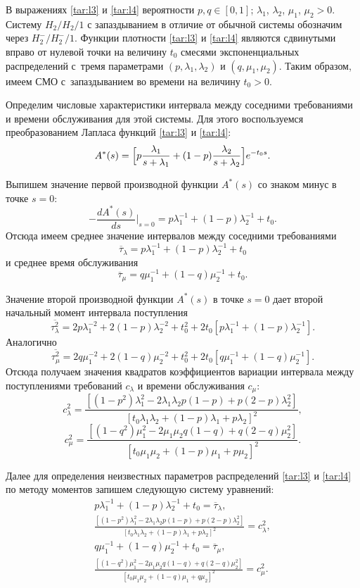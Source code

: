 В выражениях \eqref{tar:l3} и \eqref{tar:l4} вероятности $p,q\in[0,1]$; 
$\lambda_1$, $\lambda_2$, $\mu_1$, $\mu_2>0$. 
Систему $H_2/H_2/1$ с запаздыванием в отличие от обычной системы обозначим через $H_2^-/H_2^-/1$. 
Функции плотности \eqref{tar:l3} и \eqref{tar:l4} являются сдвинутыми вправо от нулевой точки на величину $t_0$ смесями экспоненциальных распределений с~тремя параметрами $(p,\lambda_1,\lambda_2)$ и $(q,\mu_1,\mu_2)$. 
Таким образом, имеем СМО с~запаздыванием во времени на величину $t_0>0$. 

Определим числовые характеристики интервала между соседними требованиями и времени обслуживания для этой системы. Для этого воспользуемся преобразованием Лапласа функций \eqref{tar:l3} и \eqref{tar:l4}:
$$
A^*(s)=\Bigl[p\frac{\lambda_1}{s+\lambda_1}+(1-p)\frac{\lambda_2}{s+\lambda_2}\Bigr]e^{-t_0s}.
$$

Выпишем значение первой производной функции $A^*(s)$  со знаком минус в точке $s=0$: 
$$
-\frac{dA^{*}(s)}{ds}\Bigr\vert_{s=0}=p\lambda_{1}^{-1}+(1-p)\lambda_{2}^{-1}+t_0.
$$ 
Отсюда имеем среднее значение интервалов между соседними требованиями $$\overline{\tau}_{\lambda}=p\lambda_1^{-1}+(1-p)\lambda_{2}^{-1}+t_0
$$ 
и   среднее время обслуживания
$$\overline{\tau}_{\mu}=q\mu_1^{-1}+(1-q)\mu_{2}^{-1}+t_0.
$$ 

Значение второй производной функции $A^*(s)$ в точке $s=0$ дает второй начальный момент интервала поступления
$$
\overline{\tau_{\lambda}^2}=2p\lambda_1^{-2}+2(1-p)\lambda_{2}^{-2}+t_0^2+2t_0[p\lambda_1^{-1}+(1-p)\lambda_2^{-1}].
$$
Аналогично 
$$
\overline{\tau_{\mu}^2}=2q\mu_1^{-2}+2(1-q)\mu_{2}^{-2}+t_0^2+2t_0[q\mu_1^{-1}+(1-q)\mu_2^{-1}].
$$
Отсюда получаем значения квадратов коэффициентов вариации интервала между поступлениями требований $c_{\lambda}$  и времени обслуживания $c_{\mu}$: 
$$
c_{\lambda}^2=\frac{[(1-p^2)\lambda_1^2-2\lambda_1\lambda_2p(1-p)+p(2-p)\lambda_2^2]}{[t_0\lambda_1\lambda_2+(1-p)\lambda_1+p\lambda_2]^2},$$
$$
c_{\mu}^2=\frac{[(1-q^2)\mu_1^2-2\mu_1\mu_2q(1-q)+q(2-q)\mu_2^2]}{[t_0\mu_1\mu_2+(1-p)\mu_1+p\mu_2]^2}.
$$ 

Далее для определения неизвестных параметров распределений \eqref{tar:l3} и \eqref{tar:l4} по методу моментов запишем следующую систему уравнений:
\begin{gather}
\label{tar:l5}
p\lambda_1^{-1}+(1-p)\lambda_{2}^{-1}+t_0=\overline{\tau}_{\lambda},
\\
\label{tar:l6}
\frac{[(1-p^2)\lambda_1^2-2\lambda_1\lambda_2p(1-p)+p(2-p)\lambda_2^2]}{[t_0\lambda_1\lambda_2+(1-p)\lambda_1+p\lambda_2]^2}=c_{\lambda}^2,
\\
\label{tar:l7}
q\mu_1^{-1}+(1-q)\mu_{2}^{-1}+t_0=\overline{\tau}_{\mu},
\\
\label{tar:l8}
\frac{[(1-q^2)\mu_1^2-2\mu_1\mu_2q(1-q)+q(2-q)\mu_2^2]}{[t_0\mu_1\mu_2+(1-q)\mu_1+q\mu_2]^2}=c_{\mu}^2.
\end{gather}

